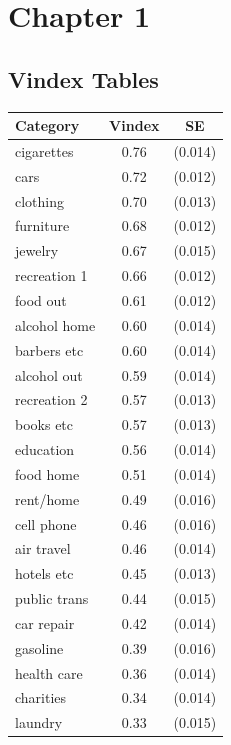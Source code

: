 \chapter{Chapter 1}
\label{sec:ap1}

\clearpage

\section{Vindex Tables}
\label{sec:vin_tables}

\begin{table}[!ht]
    \centering
\begin{tabular}{lcc}
	\hline
	Category & Vindex & SE \\
	\hline \hline
cigarettes       & 0.76 & (0.014) \\
cars             & 0.72 & (0.012) \\
clothing         & 0.70 & (0.013) \\
furniture        & 0.68 & (0.012) \\
jewelry          & 0.67 & (0.015) \\
recreation 1     & 0.66 & (0.012) \\
food out         & 0.61 & (0.012) \\
alcohol home     & 0.60 & (0.014) \\
barbers etc      & 0.60 & (0.014) \\
alcohol out      & 0.59 & (0.014) \\
recreation 2     & 0.57 & (0.013) \\
books etc        & 0.57 & (0.013) \\
education        & 0.56 & (0.014) \\
food home        & 0.51 & (0.014) \\
rent/home        & 0.49 & (0.016) \\
cell phone       & 0.46 & (0.016) \\
air travel       & 0.46 & (0.014) \\
hotels etc       & 0.45 & (0.013) \\
public trans     & 0.44 & (0.015) \\
car repair       & 0.42 & (0.014) \\
gasoline         & 0.39 & (0.016) \\
health care      & 0.36 & (0.014) \\
charities        & 0.34 & (0.014) \\
laundry          & 0.33 & (0.015) \\

\end{tabular}
\end{table}
